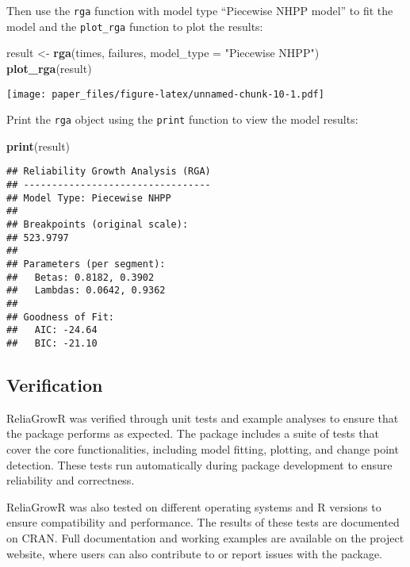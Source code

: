 \documentclass[
]{article}
\newenvironment{Shaded}{\begin{snugshade}}{\end{snugshade}}
\newcommand{\AttributeTok}[1]{\textcolor[rgb]{0.13,0.29,0.53}{#1}}
\newcommand{\FunctionTok}[1]{\textcolor[rgb]{0.13,0.29,0.53}{\textbf{#1}}}
\newcommand{\NormalTok}[1]{#1}
\newcommand{\OtherTok}[1]{\textcolor[rgb]{0.56,0.35,0.01}{#1}}
\newcommand{\StringTok}[1]{\textcolor[rgb]{0.31,0.60,0.02}{#1}}
\begin{document}
Then use the \texttt{rga} function with model type ``Piecewise NHPP
model'' to fit the model and the \texttt{plot\_rga} function to plot the
results:

\begin{Shaded}
\begin{Highlighting}[]
\NormalTok{result }\OtherTok{\textless{}{-}} \FunctionTok{rga}\NormalTok{(times, failures, }\AttributeTok{model\_type =} \StringTok{"Piecewise NHPP"}\NormalTok{)}
\FunctionTok{plot\_rga}\NormalTok{(result)}
\end{Highlighting}
\end{Shaded}

\texttt{[image: paper\_files/figure-latex/unnamed-chunk-10-1.pdf]}

Print the \texttt{rga} object using the \texttt{print} function to view
the model results:

\begin{Shaded}
\begin{Highlighting}[]
\FunctionTok{print}\NormalTok{(result)}
\end{Highlighting}
\end{Shaded}

\begin{verbatim}
## Reliability Growth Analysis (RGA)
## ---------------------------------
## Model Type: Piecewise NHPP 
## 
## Breakpoints (original scale):
## 523.9797 
## 
## Parameters (per segment):
##   Betas: 0.8182, 0.3902
##   Lambdas: 0.0642, 0.9362
## 
## Goodness of Fit:
##   AIC: -24.64
##   BIC: -21.10
\end{verbatim}

\subsection{Verification}\label{verification}

ReliaGrowR was verified through unit tests and example analyses to
ensure that the package performs as expected. The package includes a
suite of tests that cover the core functionalities, including model
fitting, plotting, and change point detection. These tests run
automatically during package development to ensure reliability and
correctness.

ReliaGrowR was also tested on different operating systems and R versions
to ensure compatibility and performance. The results of these tests are
documented on CRAN. Full documentation and working examples are
available on the project website, where users can also contribute to or
report issues with the package.
\end{document}
